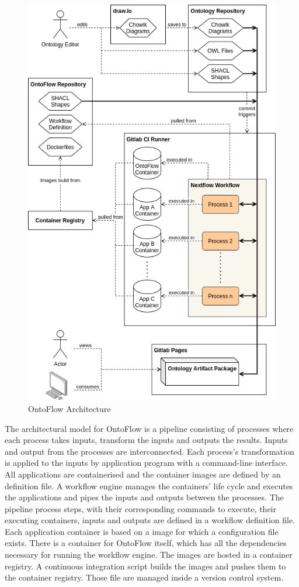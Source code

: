 \documentclass[sigconf]{acmart}
\begin{document}
\begin{figure}[ht]
  \centering
  \includegraphics[scale=0.4]{architecture.png}
  \caption{OntoFlow Architecture}
  \label{fig:architecture}
\end{figure}

The architectural model for OntoFlow is a pipeline consisting of processes where each process takes inputs, transform the inputs and outputs the results.
Inputs and output from the processes are interconnected.
Each process's transformation is applied to the inputs by application program with a command-line interface.
All applications are containerised and the container images are defined by an definition file.
A workflow engine manages the containers' life cycle and executes the applications and pipes the inputs and outputs between the processes.
The pipeline process steps, with their corresponding commands to execute, their executing containers, inputs and outputs are defined in a workflow definition file.
Each application container is based on a image for which a configuration file exists.
There is a container for OntoFlow itself, which has all the dependencies necessary for running the workflow engine.
The images are hosted in a container registry.
A continuous integration script builds the images and pushes them to the container registry.
Those file are managed inside a version control system.
\end{document}
